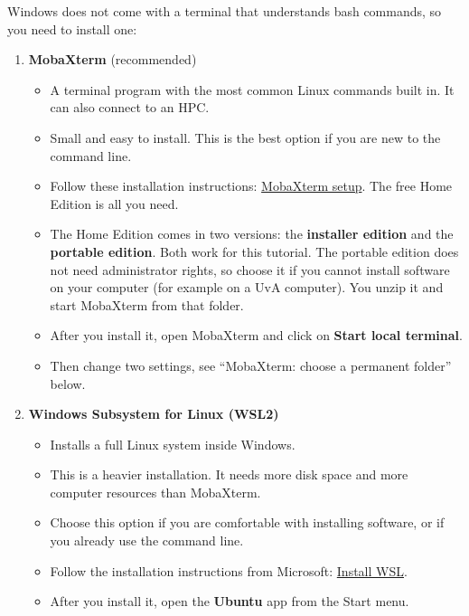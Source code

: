 \documentclass[
  letterpaper,
  DIV=11,
  numbers=noendperiod]{scrreprt}
\providecommand{\tightlist}{%
  \setlength{\itemsep}{0pt}\setlength{\parskip}{0pt}}
\begin{document}
Windows does not come with a terminal that understands bash commands, so
you need to install one:

\begin{enumerate}
\def\labelenumi{\arabic{enumi}.}
\tightlist
\item
  \textbf{MobaXterm} (recommended)

  \begin{itemize}
  \tightlist
  \item
    A terminal program with the most common Linux commands built in. It
    can also connect to an HPC.
  \item
    Small and easy to install. This is the best option if you are new to
    the command line.
  \item
    Follow these installation instructions:
    \href{https://hpc.ncsu.edu/Documents/mobaxterm.php}{MobaXterm
    setup}. The free Home Edition is all you need.
  \item
    The Home Edition comes in two versions: the \textbf{installer
    edition} and the \textbf{portable edition}. Both work for this
    tutorial. The portable edition does not need administrator rights,
    so choose it if you cannot install software on your computer (for
    example on a UvA computer). You unzip it and start MobaXterm from
    that folder.
  \item
    After you install it, open MobaXterm and click on \textbf{Start
    local terminal}.
  \item
    Then change two settings, see ``MobaXterm: choose a permanent
    folder'' below.
  \end{itemize}
\item
  \textbf{Windows Subsystem for Linux (WSL2)}

  \begin{itemize}
  \tightlist
  \item
    Installs a full Linux system inside Windows.
  \item
    This is a heavier installation. It needs more disk space and more
    computer resources than MobaXterm.
  \item
    Choose this option if you are comfortable with installing software,
    or if you already use the command line.
  \item
    Follow the installation instructions from Microsoft:
    \href{https://learn.microsoft.com/en-us/windows/wsl/install}{Install
    WSL}.
  \item
    After you install it, open the \textbf{Ubuntu} app from the Start
    menu.
  \end{itemize}
\end{enumerate}
\end{document}
